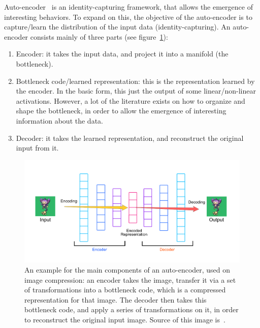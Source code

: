   \par Auto-encoder~\citep{hinton2006reducing} is an identity-capturing framework, that allows the emergence of interesting behaviors. To expand on this, the objective of the auto-encoder is to capture/learn the distribution of the input data (identity-capturing). An auto-encoder consists mainly of three parts (see figure~\ref{fig:autoenc}):
  \begin{enumerate}
    \item Encoder: it takes the input data, and project it into a manifold (the bottleneck).
    \item Bottleneck code/learned representation: this is the representation learned by the encoder. In the basic form, this just the output of some linear/non-linear activations. However, a lot of the literature exists on how to organize and shape the bottleneck, in order to allow the emergence of interesting information about the data.
    \item Decoder: it takes the learned representation, and reconstruct the original input from it.
  \end{enumerate}

  \begin{figure}[!htbp]
    \centering
    \includegraphics[scale=0.4]{images/framework/autoencoder.png}
    \caption{An example for the main components of an auto-encoder, used on image compression: an encoder takes the image, transfer it via a set of transformations into a bottleneck code, which is a compressed representation for that image. The decoder then takes this bottleneck code, and apply a series of transformations on it, in order to reconstruct the original input image. Source of this image is~\citep{autoencsimage}.}
    \label{fig:autoenc}
  \end{figure}


